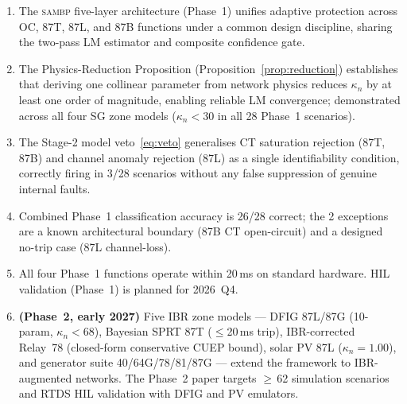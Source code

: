 \documentclass[journal,twoside,10pt]{IEEEtran}
\begin{document}
\begin{enumerate}
  \item The \textsc{sambp} five-layer architecture (Phase~1) unifies adaptive
        protection across OC, 87T, 87L, and 87B functions under a
        common design discipline, sharing the two-pass LM estimator
        and composite confidence gate.
  \item The Physics-Reduction Proposition (Proposition~\ref{prop:reduction})
        establishes that deriving one collinear parameter from network
        physics reduces $\kappa_n$ by at least one order of magnitude,
        enabling reliable LM convergence; demonstrated across all four
        SG zone models ($\kappa_n < 30$ in all 28 Phase~1 scenarios).
  \item The Stage-2 model veto~\eqref{eq:veto} generalises CT saturation
        rejection (87T, 87B) and channel anomaly rejection (87L) as
        a single identifiability condition, correctly firing in 3/28
        scenarios without any false suppression of genuine internal faults.
  \item Combined Phase~1 classification accuracy is 26/28 correct;
        the 2 exceptions are a known architectural boundary (87B CT
        open-circuit) and a designed no-trip case (87L channel-loss).
  \item All four Phase~1 functions operate within 20\,ms on standard
        hardware.  HIL validation (Phase~1) is planned for 2026~Q4.
  \item \textbf{(Phase~2, early 2027)} Five IBR zone models
        --- DFIG 87L/87G (10-param, $\kappa_n < 68$), Bayesian SPRT 87T
        ($\leq$20\,ms trip), IBR-corrected Relay~78 (closed-form
        conservative CUEP bound), solar PV 87L ($\kappa_n = 1.00$), and
        generator suite 40/64G/78/81/87G --- extend the framework to
        IBR-augmented networks.
        The Phase~2 paper targets $\geq$\,62 simulation scenarios and
        RTDS HIL validation with DFIG and PV emulators.
\end{enumerate}


\end{document}
